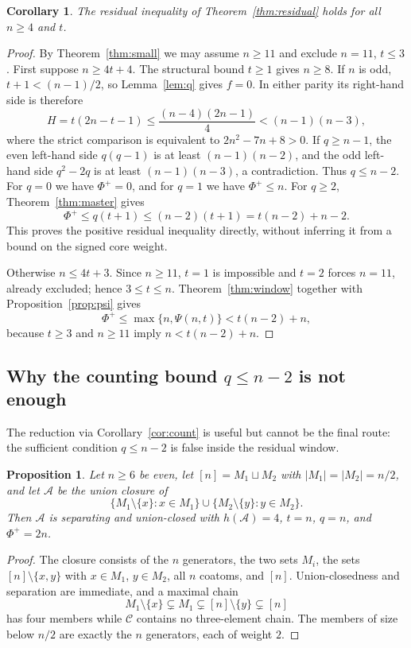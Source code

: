 \documentclass[11pt,a4paper]{amsart}
\theoremstyle{plain}
\newtheorem{proposition}[theorem]{Proposition}
\newtheorem{corollary}[theorem]{Corollary}
\theoremstyle{definition}
\newcommand{\A}{\mathcal{A}}
\newcommand{\Cc}{\mathcal{C}}
\begin{document}
\begin{corollary}\label{cor:residual}
The residual inequality of Theorem~\ref{thm:residual} holds for all $n\ge4$ and $t$.
\end{corollary}

\begin{proof}
By Theorem~\ref{thm:small} we may assume $n\ge11$ and exclude $n=11$,
$t\le3$. First suppose $n\ge4t+4$. The structural bound $t\ge1$ gives
$n\ge8$. If $n$ is odd, $t+1<(n-1)/2$, so Lemma~\ref{lem:q} gives $f=0$.
In either parity its right-hand side is therefore
\[
 H=t(2n-t-1)\le\frac{(n-4)(2n-1)}4<(n-1)(n-3),
\]
where the strict comparison is equivalent to $2n^2-7n+8>0$.
If $q\ge n-1$, the even left-hand side $q(q-1)$ is at least
$(n-1)(n-2)$, and the odd left-hand side $q^2-2q$ is at least
$(n-1)(n-3)$, a contradiction. Thus $q\le n-2$.
For $q=0$ we have $\Phi^+=0$, and for $q=1$ we have $\Phi^+\le n$.
For $q\ge2$, Theorem~\ref{thm:master} gives
\[
 \Phi^+\le q(t+1)\le(n-2)(t+1)=t(n-2)+n-2.
\]
This proves the positive residual inequality directly, without inferring it
from a bound on the signed core weight.

Otherwise $n\le4t+3$. Since $n\ge11$, $t=1$ is impossible and $t=2$
forces $n=11$, already excluded; hence $3\le t\le n$.
Theorem~\ref{thm:window} together with Proposition~\ref{prop:psi} gives
\[
  \Phi^+\le\max\{n,\Psi(n,t)\}<t(n-2)+n,
\]
because $t\ge3$ and $n\ge11$ imply $n<t(n-2)+n$.
\end{proof}

\subsection*{Why the counting bound $q\le n-2$ is not enough}

The reduction via Corollary~\ref{cor:count} is useful but cannot be the final
route: the sufficient condition $q\le n-2$ is false inside the residual window.

\begin{proposition}\label{prop:qcex}
Let $n\ge6$ be even, let $[n]=M_1\sqcup M_2$ with
$|M_1|=|M_2|=n/2$, and let $\A$ be the union closure of
\[
  \{M_1\setminus\{x\}:x\in M_1\}
  \cup
  \{M_2\setminus\{y\}:y\in M_2\}.
\]
Then $\A$ is separating and union-closed with $h(\A)=4$, $t=n$, $q=n$, and
$\Phi^+=2n$.
\end{proposition}

\begin{proof}
The closure consists of the $n$ generators, the two sets $M_i$, the sets
$[n]\setminus\{x,y\}$ with $x\in M_1$, $y\in M_2$, all $n$ coatoms, and $[n]$.
Union-closedness and separation are immediate, and a maximal chain
\[
  M_1\setminus\{x\}
  \subsetneq
  M_1
  \subsetneq
  [n]\setminus\{y\}
  \subsetneq
  [n]
\]
has four members while $\Cc$ contains no three-element chain. The members of
size below $n/2$ are exactly the $n$ generators, each of weight $2$.
\end{proof}
\end{document}
